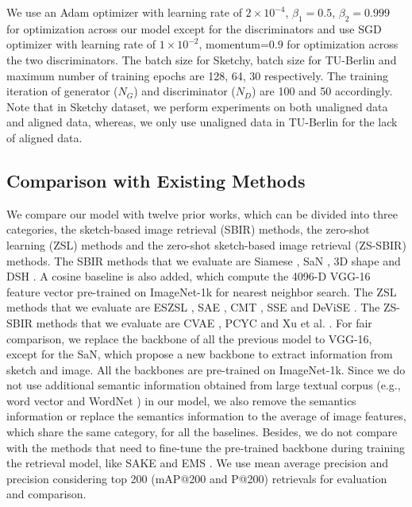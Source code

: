 \documentclass[10pt,twocolumn,letterpaper]{article}
\begin{document}
We use an Adam \cite{kingma2014adam} optimizer with learning rate of $2 \times 10^{-4}$, $\beta_1 = 0.5$, $\beta_2 = 0.999$ for optimization across our model except for the discriminators and use SGD optimizer with learning rate of $1 \times 10^{-2}$, momentum=$0.9$ for optimization across the two discriminators. The batch size for Sketchy, batch size for TU-Berlin and maximum number of training epochs are 128, 64, 30 respectively. The training iteration of generator ($N_{G}$) and discriminator ($N_{D}$) are 100 and 50 accordingly. Note that in Sketchy dataset, we perform experiments on both unaligned data and aligned data, whereas, we only use unaligned data in TU-Berlin for the lack of aligned data.

\subsection{Comparison with Existing Methods}
We compare our model with twelve prior works, which can be divided into three categories, the sketch-based image retrieval (SBIR) methods, the zero-shot learning (ZSL) methods and the zero-shot sketch-based image retrieval (ZS-SBIR) methods. 
The SBIR methods that we evaluate are Siamese \cite{yelamarthi2018zero}, SaN \cite{yu2017sketch}, 3D shape \cite{wang2015sketch} and DSH \cite{liu2017deep}. A cosine baseline is also added, which compute the 4096-D VGG-16 \cite{simonyan2014very} feature vector pre-trained on ImageNet-1k for nearest neighbor search.
The ZSL methods that we evaluate are ESZSL \cite{romera2015embarrassingly}, SAE \cite{kodirov2017semantic}, CMT \cite{socher2013zero}, SSE \cite{zhang2015bit} and DeViSE \cite{frome2013devise}.
The ZS-SBIR methods that we evaluate are CVAE \cite{yelamarthi2018zero}, PCYC \cite{dutta2019semantically} and Xu et al. \cite{xu2019semantic}.
For fair comparison, we replace the backbone of all the previous model to VGG-16, except for the SaN, which propose a new backbone to extract information from sketch and image. 
All the backbones are pre-trained on ImageNet-1k. 
Since we do not use additional semantic information obtained from large textual corpus (e.g., word vector \cite{mikolov2013distributed} and WordNet \cite{miller1998wordnet}) in our model, we also remove the semantics information or replace the semantics information to the average of image features, which share the same category, for all the baselines. 
Besides, we do not compare with the methods that need to fine-tune the pre-trained backbone during training the retrieval model, like SAKE \cite{liu2019semantic} and EMS \cite{lu2018learning}. 
We use mean average precision and precision considering top 200 (mAP@200 and P@200) retrievals for evaluation and comparison.
\end{document}
